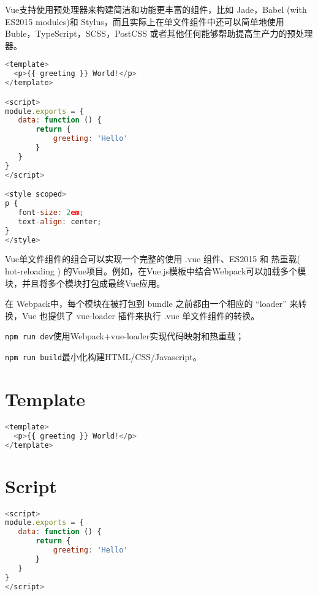 Vue支持使用预处理器来构建简洁和功能更丰富的组件，比如 Jade，Babel (with ES2015 modules)和 Stylus，而且实际上在单文件组件中还可以简单地使用 Buble，TypeScript，SCSS，PostCSS 或者其他任何能够帮助提高生产力的预处理器。


\begin{lstlisting}[language=JavaScript]
<template>
  <p>{{ greeting }} World!</p>
</template>

<script>
module.exports = {
   data: function () {
       return {
           greeting: 'Hello'
       }
   }
}
</script>

<style scoped>
p {
   font-size: 2em;
   text-align: center;
}
</style>
\end{lstlisting}

Vue单文件组件的组合可以实现一个完整的使用 .vue 组件、ES2015 和 热重载( hot-reloading ) 的Vue项目。例如，在Vue.js模板中结合Webpack可以加载多个模块，并且将多个模块打包成最终Vue应用。



在 Webpack中，每个模块在被打包到 bundle 之前都由一个相应的 “loader” 来转换，Vue 也提供了 vue-loader 插件来执行 .vue 单文件组件的转换。

\begin{compactitem}
\item \texttt{npm run dev}使用Webpack+vue-loader实现代码映射和热重载；
\item \texttt{npm run build}最小化构建HTML/CSS/Javascript。
\end{compactitem}



\section{Template}



\begin{lstlisting}[language=JavaScript]
<template>
  <p>{{ greeting }} World!</p>
</template>
\end{lstlisting}


\section{Script}


\begin{lstlisting}[language=JavaScript]
<script>
module.exports = {
   data: function () {
       return {
           greeting: 'Hello'
       }
   }
}
</script>
\end{lstlisting}

